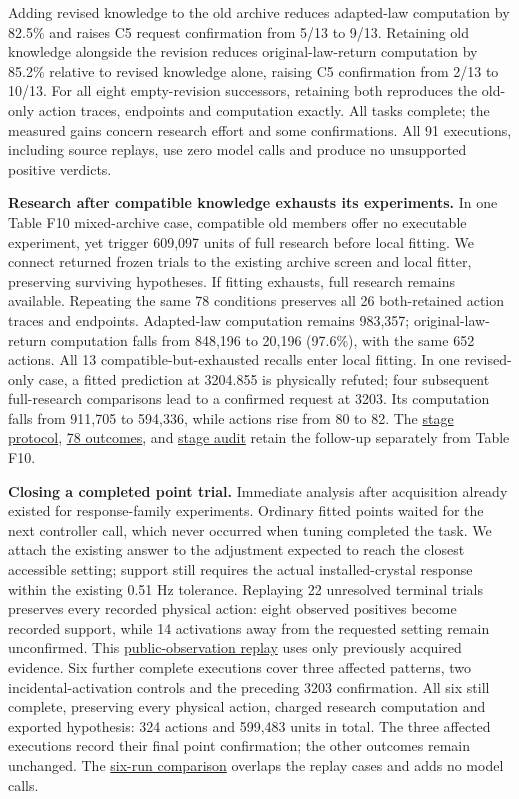 \documentclass[twoside,11pt]{article}
\begin{document}
Adding revised knowledge to the old archive reduces adapted-law computation by 82.5\% and raises C5 request confirmation from 5/13 to 9/13. Retaining old knowledge alongside the revision reduces original-law-return computation by 85.2\% relative to revised knowledge alone, raising C5 confirmation from 2/13 to 10/13. For all eight empty-revision successors, retaining both reproduces the old-only action traces, endpoints and computation exactly. All tasks complete; the measured gains concern research effort and some confirmations. All 91 executions, including source replays, use zero model calls and produce no unsupported positive verdicts.


\textbf{Research after compatible knowledge exhausts its experiments.} In one Table F10 mixed-archive case, compatible old members offer no executable experiment, yet trigger 609,097 units of full research before local fitting. We connect returned frozen trials to the existing archive screen and local fitter, preserving surviving hypotheses. If fitting exhausts, full research remains available. Repeating the same 78 conditions preserves all 26 both-retained action traces and endpoints. Adapted-law computation remains 983,357; original-law-return computation falls from 848,196 to 20,196 (97.6\%), with the same 652 actions. All 13 compatible-but-exhausted recalls enter local fitting. In one revised-only case, a fitted prediction at 3204.855 is physically refuted; four subsequent full-research comparisons lead to a confirmed request at 3203. Its computation falls from 911,705 to 594,336, while actions rise from 80 to 82. The \hyperlink{artifact-148}{stage protocol}, \hyperlink{artifact-149}{78 outcomes}, and \hyperlink{artifact-150}{stage audit} retain the follow-up separately from Table F10.


\textbf{Closing a completed point trial.} Immediate analysis after acquisition already existed for response-family experiments. Ordinary fitted points waited for the next controller call, which never occurred when tuning completed the task. We attach the existing answer to the adjustment expected to reach the closest accessible setting; support still requires the actual installed-crystal response within the existing 0.51 Hz tolerance. Replaying 22 unresolved terminal trials preserves every recorded physical action: eight observed positives become recorded support, while 14 activations away from the requested setting remain unconfirmed. This \hyperlink{artifact-151}{public-observation replay} uses only previously acquired evidence. Six further complete executions cover three affected patterns, two incidental-activation controls and the preceding 3203 confirmation. All six still complete, preserving every physical action, charged research computation and exported hypothesis: 324 actions and 599,483 units in total. The three affected executions record their final point confirmation; the other outcomes remain unchanged. The \hyperlink{artifact-152}{six-run comparison} overlaps the replay cases and adds no model calls.
\end{document}
